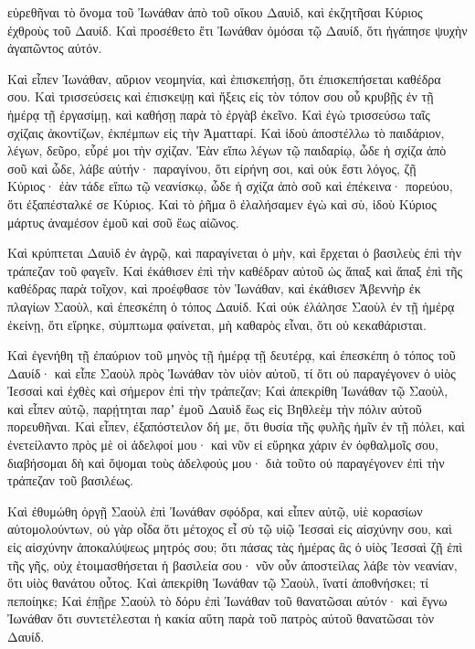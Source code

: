 {εὑρεθῆναι τὸ ὄνομα τοῦ Ἰωνάθαν ἀπὸ τοῦ οἴκου Δαυὶδ, καὶ ἐκζητῆσαι Κύριος ἐχθροὺς τοῦ Δαυίδ.
Καὶ προσέθετο ἔτι Ἰωνάθαν ὀμόσαι τῷ Δαυίδ, ὅτι ἠγάπησε ψυχὴν ἀγαπῶντος αὐτόν.
\par }{\PP {}Καὶ εἶπεν Ἰωνάθαν, αὔριον νεομηνία, καὶ ἐπισκεπήσῃ, ὅτι ἐπισκεπήσεται καθέδρα σου.
Καὶ τρισσεύσεις καὶ ἐπισκεψῃ καὶ ἥξεις εἰς τὸν τόπον σου οὗ κρυβῇς ἐν τῇ ἡμέρᾳ τῇ ἐργασίμῃ, καὶ καθήσῃ παρὰ τὸ ἐργὰβ ἐκεῖνο.
Καὶ ἐγὼ τρισσεύσω ταῖς σχίζαις ἀκοντίζων, ἐκπέμπων εἰς τὴν Ἀματταρί.
Καὶ ἰδοὺ ἀποστέλλω τὸ παιδάριον, λέγων, δεῦρο, εὗρέ μοι τὴν σχίζαν. Ἐὰν εἴπω λέγων τῷ παιδαρίῳ, ὧδε ἡ σχίζα ἀπὸ σοῦ καὶ ὧδε, λάβε αὐτήν· παραγίνου, ὅτι εἰρήνη σοι, καὶ οὐκ ἔστι λόγος, ζῇ Κύριος·
ἐὰν τάδε εἴπω τῷ νεανίσκῳ, ὧδε ἡ σχίζα ἀπὸ σοῦ καὶ ἐπέκεινα· πορεύου, ὅτι ἐξαπέσταλκέ σε Κύριος.
Καὶ τὸ ῥῆμα ὃ ἐλαλήσαμεν ἐγὼ καὶ σὺ, ἰδοὺ Κύριος μάρτυς ἀναμέσον ἐμοῦ καὶ σοῦ ἕως αἰῶνος.
\par }{\PP {}Καὶ κρύπτεται Δαυὶδ ἐν ἀγρῷ, καὶ παραγίνεται ὁ μὴν, καὶ ἔρχεται ὁ βασιλεὺς ἐπὶ τὴν τράπεζαν τοῦ φαγεῖν.
Καὶ ἐκάθισεν ἐπὶ τὴν καθέδραν αὐτοῦ ὡς ἅπαξ καὶ ἅπαξ ἐπὶ τῆς καθέδρας παρὰ τοῖχον, καὶ προέφθασε τὸν Ἰωνάθαν, καὶ ἐκάθισεν Ἀβεννὴρ ἐκ πλαγίων Σαοὺλ, καὶ ἐπεσκέπη ὁ τόπος Δαυίδ.
Καὶ οὐκ ἐλάλησε Σαοὺλ ἐν τῇ ἡμέρᾳ ἐκείνῃ, ὅτι εἴρηκε, σύμπτωμα φαίνεται, μὴ καθαρὸς εἶναι, ὅτι οὐ κεκαθάρισται.
\par }{\PP {}Καὶ ἐγενήθη τῇ ἐπαύριον τοῦ μηνὸς τῇ ἡμέρᾳ τῇ δευτέρᾳ, καὶ ἐπεσκέπη ὁ τόπος τοῦ Δαυίδ· καὶ εἶπε Σαοὺλ πρὸς Ἰωνάθαν τὸν υἱὸν αὐτοῦ, τί ὅτι οὐ παραγέγονεν ὁ υἱὸς Ἰεσσαὶ καὶ ἐχθὲς καὶ σήμερον ἐπὶ τὴν τράπεζαν;
Καὶ ἀπεκρίθη Ἰωνάθαν τῷ Σαοὺλ, καὶ εἶπεν αὐτῷ, παρῄτηται παρʼ ἐμοῦ Δαυὶδ ἕως εἰς Βηθλεὲμ τὴν πόλιν αὐτοῦ πορευθῆναι.
Καὶ εἶπεν, ἐξαπόστειλον δή με, ὅτι θυσία τῆς φυλῆς ἡμῖν ἐν τῇ πόλει, καὶ ἐνετείλαντο πρὸς μὲ οἱ ἀδελφοί μου· καὶ νῦν εἰ εὕρηκα χάριν ἐν ὀφθαλμοῖς σου, διαβήσομαι δὴ καὶ ὄψομαι τοὺς ἀδελφούς μου· διὰ τοῦτο οὐ παραγέγονεν ἐπὶ τὴν τράπεζαν τοῦ βασιλέως.
\par }{\PP {}Καὶ ἐθυμώθη ὀργῇ Σαοὺλ ἐπὶ Ἰωνάθαν σφόδρα, καὶ εἶπεν αὐτῷ, υἱὲ κορασίων αὐτομολούντων, οὐ γὰρ οἶδα ὅτι μέτοχος εἶ σὺ τῷ υἱῷ Ἰεσσαὶ εἰς αἰσχύνην σου, καὶ εἰς αἰσχύνην ἀποκαλύψεως μητρός σου;
ὅτι πάσας τὰς ἡμέρας ἃς ὁ υἱὸς Ἰεσσαὶ ζῇ ἐπὶ τῆς γῆς, οὐχ ἑτοιμασθήσεται ἡ βασιλεία σου· νῦν οὖν ἀποστείλας λάβε τὸν νεανίαν, ὅτι υἱὸς θανάτου οὗτος.
Καὶ ἀπεκρίθη Ἰωνάθαν τῷ Σαοὺλ, ἵνατί ἀποθνήσκει; τί πεποίηκε;
Καὶ ἐπῇρε Σαοὺλ τὸ δόρυ ἐπὶ Ἰωνάθαν τοῦ θανατῶσαι αὐτόν· καὶ ἔγνω Ἰωνάθαν ὅτι συντετέλεσται ἡ κακία αὕτη παρὰ τοῦ πατρὸς αὐτοῦ θανατῶσαι τὸν Δαυίδ.
}
